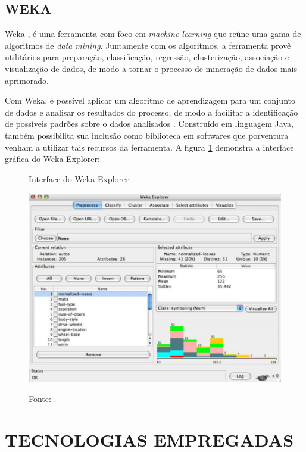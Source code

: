 \subsection{WEKA}

Weka \cite{hall2009weka}, é uma ferramenta com foco em \textit{machine learning} que reúne uma gama de algoritmos de \textit{data mining}. Juntamente com os algoritmos, a ferramenta provê utilitários para preparação, classificação, regressão, clusterização, associação e visualização de dados, de modo a tornar o processo de mineração de dados mais aprimorado.

Com Weka, é possível aplicar um algoritmo de aprendizagem para um conjunto de dados e analisar os resultados do processo, de modo a facilitar a identificação de possíveis padrões sobre o dados analisados \cite{eibe2016weka}. Construído em linguagem Java, também possibilita sua inclusão como biblioteca em softwares que porventura venham a utilizar tais recursos da ferramenta. A figura \ref{figura:weka_explorer} demonstra a interface gráfica do Weka Explorer:

\begin{figure}[H]
	\caption{Interface do Weka Explorer.}
	\centering %
	\includegraphics[width=13cm]{resources/weka.png} %
	\label{figura:weka_explorer}
	\captionsetup{singlelinecheck = false, format= hang, justification=raggedright, labelsep=space, width=13cm}
	\caption*{\footnotesize Fonte: .}
\end{figure}

\section{TECNOLOGIAS EMPREGADAS}

